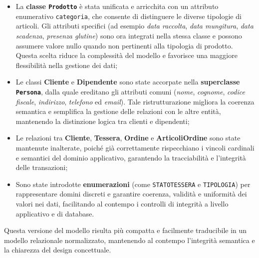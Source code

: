 \documentclass[a4paper,12pt]{article}
\begin{document}
\begin{itemize}
\item La \textbf{classe \texttt{Prodotto}} è stata unificata e arricchita con un attributo enumerativo \texttt{categoria}, che consente di distinguere le diverse tipologie di articoli. Gli attributi specifici (ad esempio \emph{data raccolta}, \emph{data mungitura}, \emph{data scadenza}, \emph{presenza glutine}) sono ora integrati nella stessa classe e possono assumere valore nullo quando non pertinenti alla tipologia di prodotto. Questa scelta riduce la complessità del modello e favorisce una maggiore flessibilità nella gestione dei dati;

\item Le classi \textbf{Cliente} e \textbf{Dipendente} sono state accorpate nella \textbf{superclasse \texttt{Persona}}, dalla quale ereditano gli attributi comuni (\emph{nome}, \emph{cognome}, \emph{codice fiscale}, \emph{indirizzo}, \emph{telefono} ed \emph{email}). Tale ristrutturazione migliora la coerenza semantica e semplifica la gestione delle relazioni con le altre entità, mantenendo la distinzione logica tra clienti e dipendenti;

\item Le relazioni tra \textbf{Cliente}, \textbf{Tessera}, \textbf{Ordine} e \textbf{ArticoliOrdine} sono state mantenute inalterate, poiché già correttamente rispecchiano i vincoli cardinali e semantici del dominio applicativo, garantendo la tracciabilità e l’integrità delle transazioni;

\item Sono state introdotte \textbf{enumerazioni} (come \texttt{STATOTESSERA} e \texttt{TIPOLOGIA}) per rappresentare domini discreti e garantire coerenza, validità e uniformità dei valori nei dati, facilitando al contempo i controlli di integrità a livello applicativo e di database.
\end{itemize}

Questa versione del modello risulta più compatta e facilmente traducibile in un modello relazionale normalizzato, mantenendo al contempo l’integrità semantica e la chiarezza del design concettuale.
\end{document}

